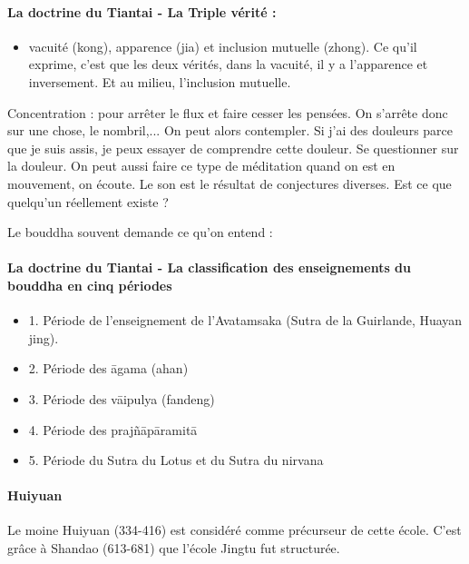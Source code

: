  \paragraph{La doctrine du Tiantai - La Triple vérité :}
 \begin{itemize}
     \item   
vacuité (kong), apparence (jia) et inclusion mutuelle (zhong). Ce qu'il exprime, c'est que les deux vérités, dans la vacuité, il y a l'apparence et inversement. Et au milieu, l'inclusion mutuelle. 
 \end{itemize}


Concentration : pour arrêter le flux et faire cesser les pensées. On s'arrête donc sur une chose, le nombril,... On peut alors contempler. Si j'ai des douleurs parce que je suis assis, je peux essayer de comprendre cette douleur. Se questionner sur la douleur. 
On peut aussi faire ce type de méditation quand on est en mouvement, on écoute. Le son est le résultat de conjectures diverses. Est ce que quelqu'un réellement existe ? 

 Le bouddha souvent demande ce qu'on entend : 

\paragraph{La doctrine du Tiantai - La classification des enseignements du bouddha en cinq périodes}

\begin{itemize}
    \item 1.	Période de l’enseignement de l’Avatamsaka (Sutra de la Guirlande, Huayan jing).
    \item 2.	Période des āgama (ahan)
    \item 3.	Période des vāipulya (fandeng)
    \item 4.	Période des prajñāpāramitā
    \item  5.	Période du Sutra du Lotus et du Sutra du nirvana
\end{itemize}

 \paragraph{Huiyuan}
Le moine Huiyuan (334-416) est considéré comme précurseur de cette école.
C’est grâce à Shandao (613-681) que l’école Jingtu fut structurée.